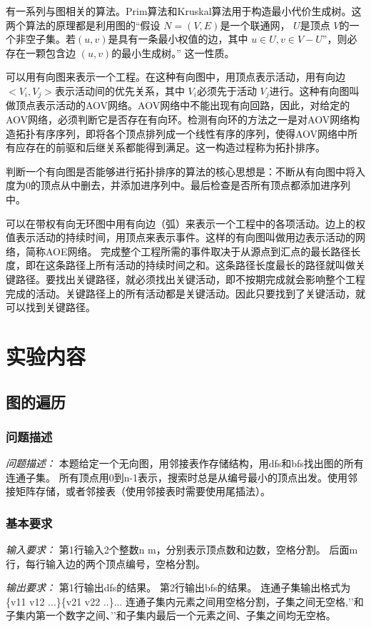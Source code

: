 \documentclass[a4paper,11pt]{article}%
\newenvironment{shadedquotation}
 {\begin{shaded*}
  \quoting[leftmargin=0pt, vskip=0pt]
 }
 {\endquoting
 \end{shaded*}
}
\begin{document}
有一系列与图相关的算法。Prim算法和Kruskal算法用于构造最小代价生成树。这两个算法的原理都是利用图的“假设 $N=(V,E)$是一个联通网， $U$是顶点 $V$的一个非空子集。若$(u,v)$是具有一条最小权值的边，其中 $u\in U,v\in V-U$”，则必存在一颗包含边 $(u,v)$的最小生成树。”
这一性质。

可以用有向图来表示一个工程。在这种有向图中，用顶点表示活动，用有向边 $<V_i,V_j>$表示活动间的优先关系，其中 $V_i$必须先于活动 $V_j$进行。这种有向图叫做顶点表示活动的AOV网络。AOV网络中不能出现有向回路，因此，对给定的AOV网络，必须判断它是否存在有向环。检测有向环的方法之一是对AOV网络构造拓扑有序序列，即将各个顶点排列成一个线性有序的序列，使得AOV网络中所有应存在的前驱和后继关系都能得到满足。这一构造过程称为拓扑排序。

判断一个有向图是否能够进行拓扑排序的算法的核心思想是：不断从有向图中将入度为0的顶点从中删去，并添加进序列中。最后检查是否所有顶点都添加进序列中。

可以在带权有向无环图中用有向边（弧）来表示一个工程中的各项活动。边上的权值表示活动的持续时间，用顶点来表示事件。这样的有向图叫做用边表示活动的网络，简称AOE网络。
完成整个工程所需的事件取决于从源点到汇点的最长路径长度，即在这条路径上所有活动的持续时间之和。这条路径长度最长的路径就叫做关键路径。要找出关键路径，就必须找出关键活动，即不按期完成就会影响整个工程完成的活动。关键路径上的所有活动都是关键活动。因此只要找到了关键活动，就可以找到关键路径。
\section{实验内容}
\subsection{图的遍历}
\subsubsection{问题描述}
\begin{shadedquotation}
    \emph{问题描述：}
    本题给定一个无向图，用邻接表作存储结构，用dfs和bfs找出图的所有连通子集。
所有顶点用0到n-1表示，搜索时总是从编号最小的顶点出发。使用邻接矩阵存储，或者邻接表（使用邻接表时需要使用尾插法）。
\end{shadedquotation}
\subsubsection{基本要求}
\begin{shadedquotation}
    \emph{输入要求：}
    第1行输入2个整数n m，分别表示顶点数和边数，空格分割。
后面m行，每行输入边的两个顶点编号，空格分割。
\end{shadedquotation}
\begin{shadedquotation}
    \emph{输出要求：}
    第1行输出dfs的结果。
第2行输出bfs的结果。
连通子集输出格式为\{v11 v12 ...\}\{v21 v22 ..\}... 连通子集内元素之间用空格分割，子集之间无空格,'{'和子集内第一个数字之间、'}'和子集内最后一个元素之间、子集之间均无空格。
\end{shadedquotation}
\end{document}
